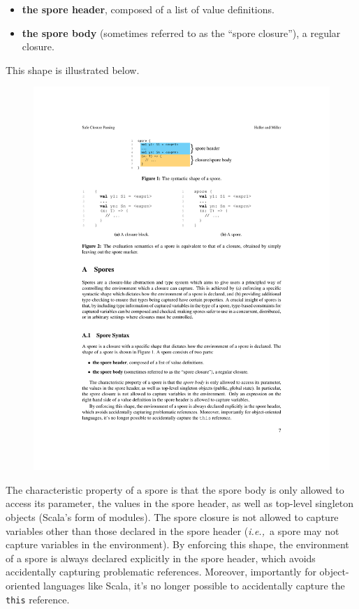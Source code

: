 \documentclass[preprint]{sigplanconf}
\theoremstyle{definition}
\theoremstyle{definition}
\newcommand{\ie}{{\em i.e.,~}}
\begin{document}
\begin{itemize}[noitemsep]
\item {\bf the spore header}, composed of a list of value definitions.
\item {\bf the spore body} (sometimes referred to as the “spore closure”), a regular closure.
\end{itemize}

\noindent This shape is illustrated below.

\vspace{-1mm}
\begin{figure}[h!]
\centering\includegraphics[width=0.75\columnwidth]{spore-shape.pdf}
\end{figure}
\vspace{-1mm}

The characteristic property of a spore is that the spore body is only allowed
to access its parameter, the values in the spore header, as well as top-level
singleton objects (Scala's form of modules). The spore closure is not allowed
to capture variables other than those declared in the spore header (\ie a
spore may not capture variables in the environment). By enforcing this shape,
the environment of a spore is always declared explicitly in the spore header,
which avoids accidentally capturing problematic references. Moreover,
importantly for object-oriented languages like Scala, it's no longer possible
to accidentally capture the \verb|this| reference.
\end{document}
